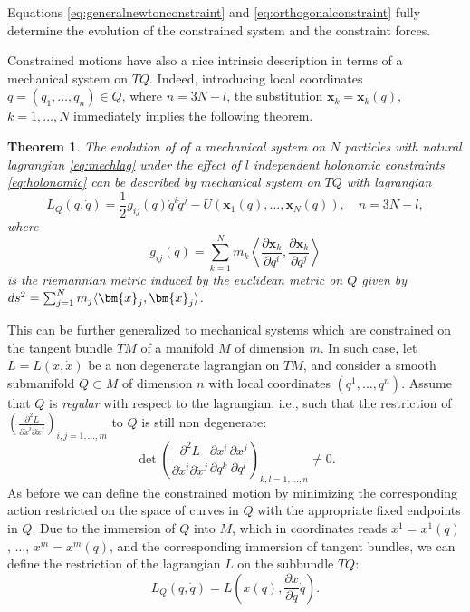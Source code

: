 \documentclass[english,fontsize=11pt,paper=a5,oneside]{scrbook}
\newcommand{\bx}{\bm{x}}
\newcommand{\lag}{\langle}
\newcommand{\rag}{\rangle}
\let\d\relax
\newcommand{\d}{\mathrm{d}}
\newtheorem{theorem}{Theorem}[chapter]
\theoremstyle{definition}
\begin{document}
Equations \eqref{eq:generalnewtonconstraint} and \eqref{eq:orthogonalconstraint} fully determine the evolution of the constrained system and the constraint forces.

Constrained motions have also a nice intrinsic description in terms of a mechanical system on $TQ$. Indeed, introducing local coordinates $q= (q_1, \ldots, q_n)\in Q$, where $n = 3N-l$, the substitution $\bx_k = \bx_k(q)$, $k=1,\ldots,N$ immediately implies the following theorem.

\begin{theorem}
  The evolution of of a mechanical system on $N$ particles with natural lagrangian \eqref{eq:mechlag} under the effect of $l$ independent holonomic constraints \eqref{eq:holonomic} can be described by mechanical system on $TQ$ with lagrangian
  \begin{equation}
    L_Q(q,\dot q) = \frac12 g_{ij}(q)\dot q^i \dot q^j - U(\bx_1(q),\ldots,\bx_N(q)), \quad n = 3N-l,
  \end{equation}
  where
  \begin{equation}
    g_{ij}(q) = \sum_{k=1}^N m_k\left\lag\frac{\partial \bx_k}{\partial q^i},\frac{\partial \bx_k}{\partial q^j}\right\rag
  \end{equation}
  is the riemannian metric induced by the euclidean metric on $Q$ given by
  $ds^2 = \sum_{j=1}^N m_j\lag\d \bx_j, \d\bx_j\rag$.
\end{theorem}

This can be further generalized to mechanical systems which are constrained on the tangent bundle $TM$ of a manifold $M$ of dimension $m$.
In such case, let  $L=L(x,\dot x)$ be a non degenerate lagrangian on $TM$, and consider a smooth submanifold $Q\subset M$ of dimension $n$ with local coordinates $(q^1,\ldots,q^n)$.
Assume that $Q$ is \emph{regular} with respect to the lagrangian, i.e., such that the restriction of $\left(\frac{\partial^2 L}{\partial \dot x^i \partial\dot x^j}\right)_{i,j=1,\ldots,m}$ to $Q$ is still non degenerate:
\begin{equation}
  \det\left(\frac{\partial^2 L}{\partial \dot x^i \partial\dot x^j}\frac{\partial x^i}{\partial q^k}\frac{\partial x^j}{\partial q^l}\right)_{k,l=1,\ldots,n} \neq 0.
\end{equation}
As before we can define the constrained motion by minimizing the corresponding action restricted on the space of curves in $Q$ with the appropriate fixed endpoints in $Q$. Due to the immersion of $Q$ into $M$, which in coordinates reads $x^1 = x^1(q)$, $\ldots$, $x^m=x^m(q)$, and the corresponding immersion of tangent bundles, we can define the restriction of the lagrangian $L$ on the subbundle $TQ$:
\begin{equation}\label{eq:dalembertmanifold}
  L_Q(q,\dot q) = L\left(x(q), \frac{\partial x}{\partial q}\dot q\right).
\end{equation}
\end{document}
